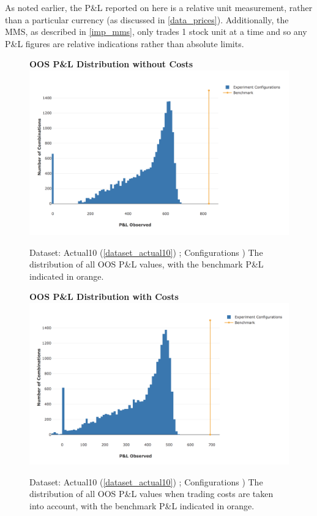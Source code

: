 \documentclass[a4paper,11pt,oneside]{article}
\theoremstyle{plain}
\theoremstyle{definition}
\begin{document}
As noted earlier, the P\&L reported on here is a relative unit measurement, rather than a particular currency (as discussed in \ref{data_prices}). Additionally, the MMS, as described in \ref{imp_mms}, only trades 1 stock unit at a time and so any P\&L figures are relative indications rather than absolute limits.

\begin{figure}[H]
	\centering
	\textbf{OOS P\&L Distribution without Costs}
	\includegraphics[scale=0.35]{images/results/mms/profits_nocost.png} 
	\caption[OOS P\&L Distribution without Costs]{Dataset: Actual10 (\ref{dataset_actual10}) ; Configurations )
		\newline The distribution of all OOS P\&L values, with the benchmark P\&L indicated in orange.}
	\label{figure-results_pl_pdf}
\end{figure}

\begin{figure}[H]
	\centering
	\textbf{OOS P\&L Distribution with Costs}
	\includegraphics[scale=0.35]{images/results/mms/profits_cost.png} 
	\caption[OOS P\&L Distribution with Costs]{Dataset: Actual10 (\ref{dataset_actual10}) ; Configurations )
		\newline The distribution of all OOS P\&L values when trading costs are taken into account, with the benchmark P\&L indicated in orange.}
	\label{figure-results_pl_pdf_cost}
\end{figure}
\end{document}
